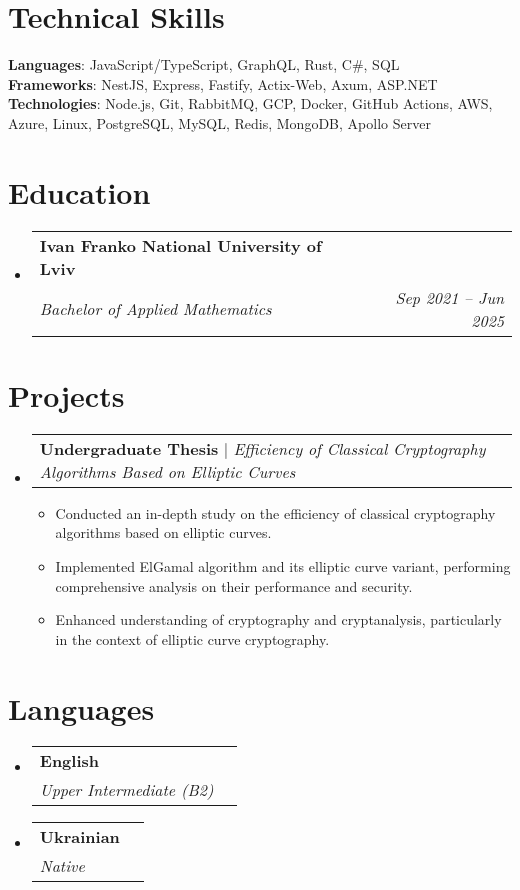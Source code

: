 \documentclass[letterpaper,11pt]{article}
\makeatletter
\newcommand{\resumeItem}[1]{
  \item\small{
    {#1 \vspace{-2pt}}
  }
}
\newcommand{\resumeSubheading}[4]{
  \vspace{-2pt}\item
    \begin{tabular*}{0.97\textwidth}[t]{l@{\extracolsep{\fill}}r}
      \textbf{#1} & #2 \\
      \textit{\small#3} & \textit{\small #4} \\
    \end{tabular*}\vspace{-7pt}
}
\newcommand{\resumeSubHeadingListStart}{\begin{itemize}[leftmargin=0.15in, label={}]}
\newcommand{\resumeSubHeadingListEnd}{\end{itemize}}
\newcommand{\resumeItemListStart}{\begin{itemize}}
\newcommand{\resumeItemListEnd}{\end{itemize}\vspace{-5pt}}
\newcommand{\resumeProjectHeading}[2]{
    \item
    \begin{tabular*}{0.97\textwidth}{l@{\extracolsep{\fill}}r}
      \small#1 & #2 \\
    \end{tabular*}\vspace{5pt}  %
}
\makeatother
\begin{document}
\section{Technical Skills}
 \begin{itemize}[leftmargin=0.15in, label={}]
    \small{\item{
     \textbf{Languages}{: JavaScript/TypeScript, GraphQL, Rust, C\#, SQL} \\
     \textbf{Frameworks}{: NestJS, Express, Fastify, Actix-Web, Axum, ASP.NET} \\
     \textbf{Technologies}{: Node.js, Git, RabbitMQ, GCP, Docker, GitHub Actions, AWS, Azure, Linux, PostgreSQL, MySQL, Redis, MongoDB, Apollo Server} \\
    }}
 \end{itemize}
 
\section{Education}
  \resumeSubHeadingListStart
    \resumeSubheading
      {Ivan Franko National University of Lviv}{}
      {Bachelor of Applied Mathematics} {Sep 2021 -- Jun 2025}
  \resumeSubHeadingListEnd

\section{Projects}
    \resumeSubHeadingListStart
      \resumeProjectHeading
          {\textbf{Undergraduate Thesis} $|$ \emph{Efficiency of Classical Cryptography Algorithms Based on Elliptic Curves}}{}
          \resumeItemListStart
            \resumeItem{Conducted an in-depth study on the efficiency of classical cryptography algorithms based on elliptic curves.}
            \resumeItem{Implemented ElGamal algorithm and its elliptic curve variant, performing comprehensive analysis on their performance and security.}
            \resumeItem{Enhanced understanding of cryptography and cryptanalysis, particularly in the context of elliptic curve cryptography.}
          \resumeItemListEnd
    \resumeSubHeadingListEnd
    
\section{Languages}
  \resumeSubHeadingListStart
    \resumeSubheading
      {English}{}
      {Upper Intermediate (B2)} {}
    \resumeSubheading
      {Ukrainian}{}
      {Native} {}
  \resumeSubHeadingListEnd
  
\end{document}
